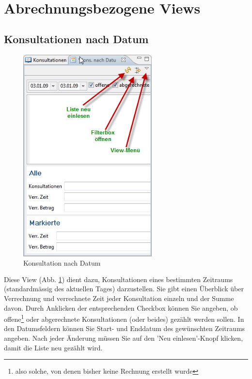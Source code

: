 %

\section{Abrechnungsbezogene Views}
\subsection{Konsultationen nach Datum}
\begin{figure}
\includegraphics[width=7cm]{images/heute}
\caption{Konsultation nach Datum}
\label{fig:heute}
\end{figure}

Diese View (Abb. \ref{fig:heute}) dient dazu, Konsultationen eines bestimmten Zeitraums (standardmässig
des aktuellen Tages) darzustellen. Sie gibt einen Überblick über Verrechnung und
verrechnete Zeit jeder Konsultation einzeln und der Summe davon. Durch Anklicken der entsprechenden Checkbox können Sie angeben, ob offene\footnote{also solche, von denen bisher keine Rechnung erstellt wurde} oder abgerechnete Konsultationen (oder beides) gezählt werden sollen. In den Datumsfeldern können Sie Start- und Enddatum des gewünschten Zeitraums angeben. Nach jeder Änderung müssen Sie auf den 'Neu einlesen'-Knopf klicken, damit die Liste neu gezählt wird.

